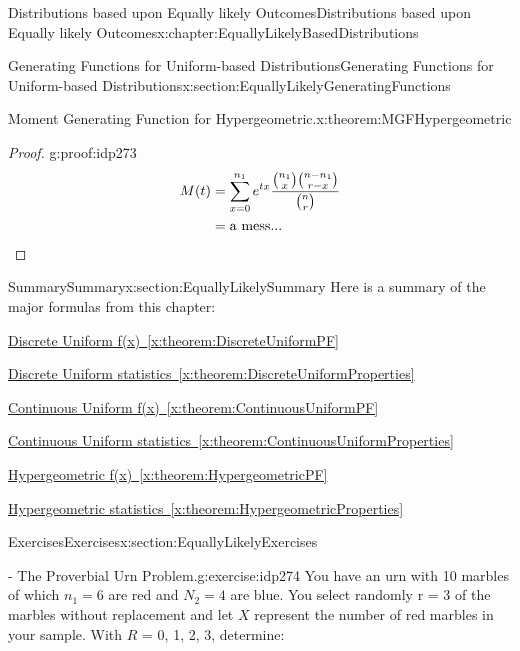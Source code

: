 \documentclass[oneside,10pt,]{book}
\newcommand{\xreffont}{\relax}
\newcommand{\qedhere}{\relax}
\numberwithin{equation}{section}
\begin{document}
\begin{chapterptx}{Distributions based upon Equally likely Outcomes}{}{Distributions based upon Equally likely Outcomes}{}{}{x:chapter:EquallyLikelyBasedDistributions}
\begin{sectionptx}{Generating Functions for Uniform-based Distributions}{}{Generating Functions for Uniform-based Distributions}{}{}{x:section:EquallyLikelyGeneratingFunctions}
\begin{theorem}{Moment Generating Function for Hypergeometric.}{}{x:theorem:MGFHypergeometric}
%
\end{theorem}
\begin{proof}{}{g:proof:idp273}
%
\begin{align*}
M(t) & = \sum_{x=0}^{n_1} e^{tx} \frac{\binom{n_1}{x} \binom{n-n_1}{r-x}}{\binom{n}{r}}\\
& = \text{a mess...}\qedhere
\end{align*}
%
\end{proof}
\end{sectionptx}
%
%
\typeout{************************************************}
\typeout{************************************************}
%
\begin{sectionptx}{Summary}{}{Summary}{}{}{x:section:EquallyLikelySummary}
Here is a summary of the major formulas from this chapter:%
\par
\hyperref[x:theorem:DiscreteUniformPF]{Discrete Uniform f(x)~{\xreffont\ref{x:theorem:DiscreteUniformPF}}}%
\par
\hyperref[x:theorem:DiscreteUniformProperties]{Discrete Uniform statistics~{\xreffont\ref{x:theorem:DiscreteUniformProperties}}}%
\par
\hyperref[x:theorem:ContinuousUniformPF]{Continuous Uniform f(x)~{\xreffont\ref{x:theorem:ContinuousUniformPF}}}%
\par
\hyperref[x:theorem:ContinuousUniformProperties]{Continuous Uniform statistics~{\xreffont\ref{x:theorem:ContinuousUniformProperties}}}%
\par
\hyperref[x:theorem:HypergeometricPF]{Hypergeometric f(x)~{\xreffont\ref{x:theorem:HypergeometricPF}}}%
\par
\hyperref[x:theorem:HypergeometricProperties]{Hypergeometric statistics~{\xreffont\ref{x:theorem:HypergeometricProperties}}}%
\end{sectionptx}
%
%
\typeout{************************************************}
\typeout{************************************************}
%
\begin{sectionptx}{Exercises}{}{Exercises}{}{}{x:section:EquallyLikelyExercises}
\begin{inlineexercise}{- The Proverbial Urn Problem.}{g:exercise:idp274}%
You have an urn with 10 marbles of which \(n_1 = 6\) are red and \(N_2 = 4\) are blue. You select randomly r = 3 of the marbles without replacement and let \(X\) represent the number of red marbles in your sample. With \(R\) = \textbraceleft{}0, 1, 2, 3\textbraceright{}, determine:%
\begin{itemize}[label=\textbullet]

\end{itemize}
\end{inlineexercise}
\end{sectionptx}
\end{chapterptx}
\end{document}
